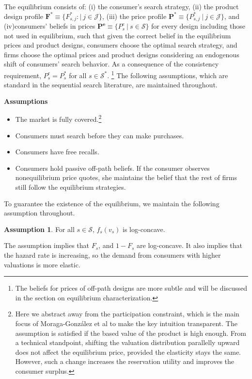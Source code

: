 \documentclass[14pt]{article}
\theoremstyle{plain}
\theoremstyle{definition}
\newtheorem{ass}{Assumption}
\theoremstyle{remark}
\DeclareRobustCommand\1{\futurelet\oneNext\oneCheck}
\renewcommand{\S}{\mathcal{S}}
\begin{document}
The equilibrium consists of:
(i) the consumer's search strategy,
(ii) the product design profile $\mathbf{F^*} \equiv \{F^*_{s,j} 
:|\: j \in \mathcal{J} \}$,
(iii) the price profile $ \mathbf{P^*} \equiv \{P^{*}_{s,j} \:|  \:j \in \mathcal{J} \}$,
and 
(iv)consumers' beliefs in prices $\mathbf{P^e}\equiv\{P^e_s\:| \:s\in \S\}$ for every design including those not used in equilibrium,
such that given the correct belief in the equilibrium prices and product designs, consumers choose the optimal search strategy, and firms choose the optimal prices and product designs considering an endogenous shift of consumers' search behavior. As a consequence of the consistency requirement, $P^e_s = P_s^*$ for all $s\in\S^*$. \footnote{The beliefs for prices of off-path designs are more subtle and will be discussed in the section on equilibrium characterization.}
The following assumptions, which are standard in the sequential search literature, are maintained throughout. 


\noindent \textbf{Assumptions }
    \begin{itemize}
        \item The market is fully covered.\footnote{Here we abstract away from the participation constraint, which is the main focus of Moraga-Gonz{\' a}lez et al to make the key intuition transparent. The assumption is satisfied if the based value of the product is high enough. From a technical standpoint, shifting the valuation distribution parallelly upward does not affect the equilibrium price,  provided the elasticity stays the same. However, such a change increases the reservation utility and improves the consumer surplus. }
        \item Consumers must search before they can make purchases.
        \item Consumers have free recalls.
        \item Consumers hold passive off-path beliefs. If the consumer observes nonequilibrium price quotes, she maintains the belief that the rest of firms still follow the equilibrium strategies.
    \end{itemize}
To guarantee the existence of the equilibrium, we maintain the following assumption throughout. 
\begin{ass} \label{ass:logconcave_f}
For all $s\in\mathcal{S}$, $f_s(v_s)$ is log-concave.
\end{ass}
The assumption implies that $F_s$, and $1-F_s$ are log-concave. It also implies that the hazard rate is increasing, so the demand from consumers with higher valuations is more elastic. 
\end{document}
